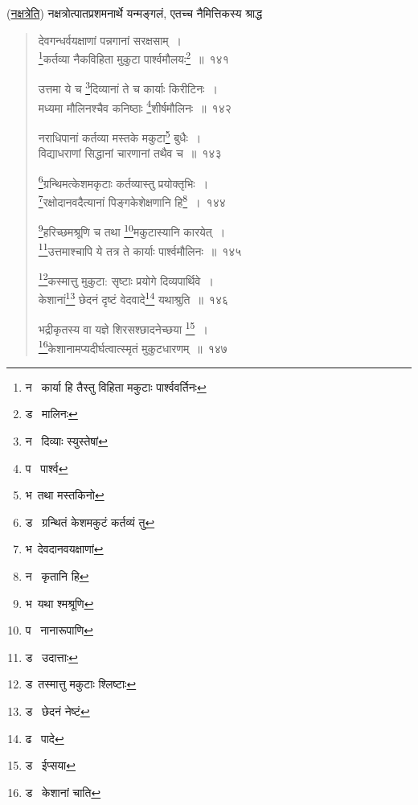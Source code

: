 \documentclass[11pt, openany]{book}
\begin{document}
\vspace{2mm}
(\underline{नक्षत्रेति}) नक्षत्रोत्पातप्रशमनार्थे यन्मङ्गलं, एतच्च नैमित्तिकस्य श्राद्ध\textendash

\newpage

\begin{quote}
{\na देवगन्धर्वयक्षाणां पन्नगानां सरक्षसाम्~।\\
\renewcommand{\thefootnote}{1}\footnote{न \textendash\ कार्या हि तैस्तु विहिता मकुटाः पार्श्ववर्तिनः}कर्तव्या नैकविहिता मुकुटा पार्श्वमौलयः\renewcommand{\thefootnote}{2}\footnote{ड \textendash\ मालिनः}~॥~१४१

उत्तमा ये च \renewcommand{\thefootnote}{3}\footnote{न \textendash\ दिव्याः स्युस्तेषां}दिव्यानां ते च कार्याः किरीटिनः~।\\
मध्यमा मौलिनश्चैव कनिष्ठाः \renewcommand{\thefootnote}{4}\footnote{प \textendash\ पार्श्व}शीर्षमौलिनः~॥~१४२

नराधिपानां कर्तव्या मस्तके मकुटा\renewcommand{\thefootnote}{5}\footnote{भ\textendash\ तथा मस्तकिनो} बुधैः~।\\
विद्याधराणां सिद्धानां चारणानां तथैव च~॥~१४३

\renewcommand{\thefootnote}{6}\footnote{ड \textendash\ ग्रन्थितं केशमकुटं कर्तव्यं तु}ग्रन्थिमत्केशमकृटाः कर्तव्यास्तु प्रयोक्तृभिः~।\\
\renewcommand{\thefootnote}{7}\footnote{भ\textendash\ देवदानवयक्षाणां}रक्षोदानवदैत्यानां पिङ्गकेशेक्षणानि हि\renewcommand{\thefootnote}{8}\footnote{न \textendash\ कृतानि हि}~।~१४४

\renewcommand{\thefootnote}{9}\footnote{भ\textendash\ यथा श्मश्रूणि}हरिच्छमश्रूणि च तथा \renewcommand{\thefootnote}{10}\footnote{प \textendash\ नानारूपाणि}मकुटास्यानि कारयेत्~।\\
\renewcommand{\thefootnote}{11}\footnote{ड \textendash\ उदात्ताः}उत्तमाश्चापि ये तत्र ते कार्याः पार्श्वमौलिनः~॥~१४५

\renewcommand{\thefootnote}{12}\footnote{ड\textendash\ तस्मात्तु मकुटाः श्लिष्टाः}कस्मात्तु मुकुटा: सृष्टाः प्रयोगे दिव्यपार्थिवे~।\\
केशानां\renewcommand{\thefootnote}{13}\footnote{ड \textendash\ छेदनं नेष्टं} छेदनं दृष्टं वेदवादे\renewcommand{\thefootnote}{14}\footnote{ढ \textendash\ पादे} यथाश्रुति~॥~१४६

भद्रीकृतस्य वा यज्ञे शिरसश्छादनेच्छया \renewcommand{\thefootnote}{15}\footnote{ड \textendash\ ईप्सया}~।\\
\renewcommand{\thefootnote}{16}\footnote{ड \textendash\ केशानां चाति}केशानामप्यदीर्घत्वात्स्मृतं मुकुटधारणम्~॥~१४७}
\end{quote}
\end{document}
